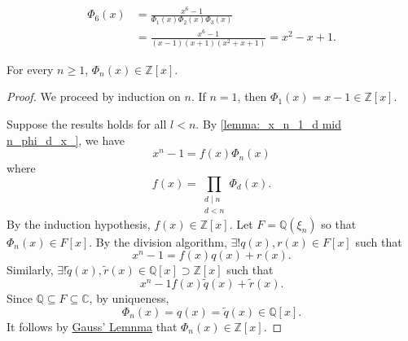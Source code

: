 \documentclass[notoc,notitlepage]{tufte-book}
\begin{document}
\begin{eg}
  \begin{align*}
    \Phi_6(x) &= \frac{x^6 - 1}{\Phi_1(x) \Phi_2(x) \Phi_3(x)} \\
              &= \frac{x^6 - 1}{(x - 1)(x + 1)(x^2 + x + 1)} = x^2 - x + 1.
  \end{align*}
\end{eg}

\begin{propo}\label{propo:cyclotomic_polynomials_have_integer_coefficients}
  For every $n \geq 1$, $\Phi_n(x) \in \mathbb{Z}[x]$.
\end{propo}

\begin{proof}
  We proceed by induction on $n$. If $n = 1$, then $\Phi_1(x) = x - 1 \in \mathbb{Z}[x]$.

  Suppose the results holds for all $l < n$. By \cref{lemma:_x_n_1_d mid n_phi_d_x_}, we
  have
  \begin{equation*}
    x^n - 1 = f(x) \Phi_n(x)
  \end{equation*}
  where
  \begin{equation*}
    f(x) = \prod_{\substack{d \mid n \\ d < n}} \Phi_d(x).
  \end{equation*}
  By the induction hypothesis, $f(x) \in \mathbb{Z}[x]$. Let $F = \mathbb{Q}(\xi_n)$ so
  that $\Phi_n(x) \in F[x]$. By the division algorithm, $\exists ! q(x), r(x) \in F[x]$
  such that
  \begin{equation*}
    x^n - 1 = f(x) q(x) + r(x).
  \end{equation*}
  Similarly, $\exists ! \tilde{q}(x), \tilde{r}(x) \in \mathbb{Q}[x] \supset
  \mathbb{Z}[x]$ such that
  \begin{equation*}
    x^n - 1 f(x) \tilde{q}(x) + \tilde{r}(x).
  \end{equation*}
  Since $\mathbb{Q} \subseteq F \subseteq \mathbb{C}$, by uniqueness,
  \begin{equation*}
    \Phi_n(x) = q(x) = \tilde{q}(x) \in \mathbb{Q}[x].
  \end{equation*}
  It follows by \hyperref[thm:gauss_lemma]{Gauss' Lemnma} that $\Phi_n(x) \in
  \mathbb{Z}[x]$.
\end{proof}
\end{document}
